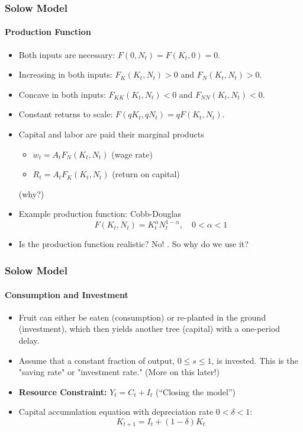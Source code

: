 \documentclass{beamer}
\begin{document}
\begin{frame}
    \frametitle{Solow Model}
    \framesubtitle{Production Function}
    \begin{itemize}
        \item Both inputs are necessary: \( F(0, N_t) = F(K_t, 0) = 0 \).
        \item Increasing in both inputs: \( F_K(K_t, N_t) > 0 \) and \( F_N(K_t, N_t) > 0 \).
        \item Concave in both inputs: \( F_{KK}(K_t, N_t) < 0 \) and \( F_{NN}(K_t, N_t) < 0 \).
        \item Constant returns to scale: \( F(qK_t, qN_t) = qF(K_t, N_t) \).
        \item Capital and labor are paid their marginal products
        \begin{itemize}
            \item \( w_t = A_t F_N(K_t, N_t) \) (wage rate)
            \item \( R_t = A_t F_K(K_t, N_t) \) (return on capital)
        \end{itemize}
        (why?)\pause
        \item Example production function: Cobb-Douglas
        \[ F(K_t, N_t) = K_t^\alpha N_t^{1-\alpha}, \quad 0 < \alpha < 1 \]
        \item Is the production function realistic? No! \parencite{Banerjee_2005}.
        So why do we use it? 
        
    \end{itemize}
\end{frame}
\begin{frame}
    \frametitle{Solow Model}
    \framesubtitle{Consumption and Investment}
    \begin{itemize}
        \item Fruit can either be eaten (consumption) or re-planted in the ground (investment), 
        which then yields another tree (capital) with a one-period delay.
        \item Assume that a constant fraction of output, 
        \( 0 \leq s \leq 1 \), is invested. 
        This is the "saving rate" or "investment rate." 
        (More on this later!)
        \pause
        \item \textbf{Resource Constraint:} \( Y_t = C_t + I_t \)
        (\enquote{Closing the model})\pause
        \item Capital accumulation equation with depreciation rate \( 0 < \delta < 1 \):
        \[ K_{t+1} = I_t + (1 - \delta)K_t \]
    \end{itemize}
\end{frame}
\end{document}

